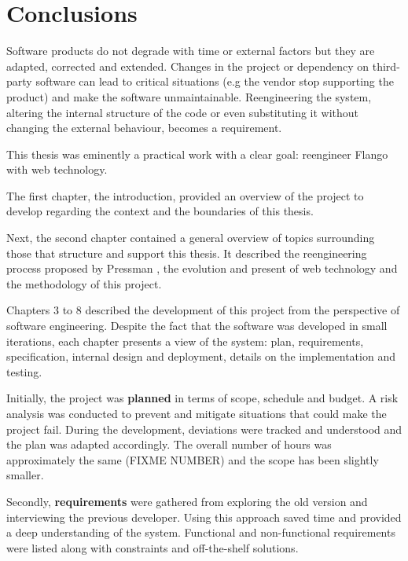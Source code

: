 \chapter{Conclusions}
Software products do not degrade with time or external factors but they are adapted, corrected and extended.
Changes in the project or dependency on third-party software can lead to critical situations (e.g the vendor stop supporting the product) and make the software unmaintainable.
Reengineering the system, altering the internal structure of the code or even substituting it without changing the external behaviour, becomes a requirement.

This thesis was eminently a practical work with a clear goal: reengineer Flango \cm with web technology.

The first chapter, the introduction, provided an overview of the project to develop regarding the context and the boundaries of this thesis.

Next, the second chapter contained a general overview of topics surrounding those that structure and support this thesis.
It described the reengineering process proposed by Pressman \cite{Pressman:2007}, the evolution and present of web technology and the methodology of this project.

Chapters 3 to 8 described the development of this project from the perspective of software engineering.
Despite the fact that the software was developed in small iterations, each chapter presents a view of the system: plan, requirements, specification, internal design and deployment, details on the implementation and testing.

Initially, the project was \textbf{planned} in terms of scope, schedule and budget. 
A risk analysis was conducted to prevent and mitigate situations that could make the project fail.
During the development, deviations were tracked and understood and the plan was adapted accordingly.
The overall number of hours was approximately the same (FIXME NUMBER) and the scope has been slightly smaller.

Secondly, \textbf{requirements} were gathered from exploring the old version and interviewing the previous developer.
Using this approach saved time and provided a deep understanding of the system.
Functional and non-functional requirements were listed along with constraints and off-the-shelf solutions.

